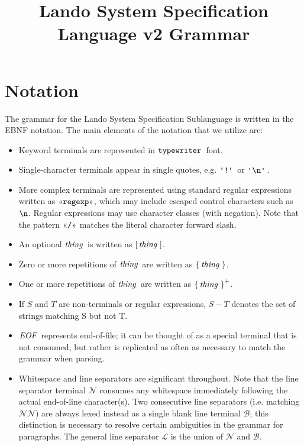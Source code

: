 \documentclass{article}
\newcommand{\gnn}{\ensuremath{\mathcal{N}}}
\newcommand{\gnl}{\ensuremath{\mathcal{L}}}
\newcommand{\gnb}{\ensuremath{\mathcal{B}}}
\begin{document}
\title{Lando System Specification Language v2 Grammar}
\maketitle

\section{Notation}

The grammar for the Lando System Specification Sublanguage is written in the EBNF notation. The main elements of the notation that we utilize are:
\begin{itemize}
  \item Keyword terminals are represented in $\mathop{\texttt{typewriter}}\,$ font. 
  \item Single-character terminals appear in single quotes, e.g. $\gtkc{!}$ or $\gtkc{\gtesc{n}}$.
  \item More complex terminals are represented using standard regular expressions written as $\gtregex{regexp}$, which may include escaped control characters such as $\texttt{\textbackslash {n}}$. Regular expressions may use character classes (with negation). Note that the pattern $\gtregex{/}$ matches the literal character forward slash.
  \item An optional $\mathop{\textit{thing}}\,$ is written as $\mathop{\operatorname{[} \mathop{\mathop{\textit{thing}}\,} \operatorname{]}}$.
  \item {Zero or more repetitions of $\mathop{\textit{thing}}\,$ are written as $\mathop{\operatorname{\{} \mathop{\textit{thing}}\, \operatorname{\}}}$}.
  \item One or more repetitions of $\mathop{\textit{thing}}\,$ are written as $\mathop{\operatorname{\{} \mathop{\textit{thing}}\, \operatorname{\}}^+}$.
  \item If $S$ and $T$ are non-terminals or regular expressions, $S - T$ denotes the set of strings matching S but not T.
  \item $\mathop{\textit{EOF}}\,$ represents end-of-file; it can be thought of as a special terminal that is not consumed, but rather is replicated as often as necessary to match the grammar when parsing.
  \item Whitespace and line separators are significant throughout. Note that the line separator terminal $\gnn$ consumes any whitespace immediately following the actual end-of-line character(s). Two consecutive line separators (i.e. matching $\gnn\gnn$) are always lexed instead as a single blank line terminal $\gnb$;
    this distinction is necessary to resolve certain ambiguities in the grammar for paragraphs.
    The general line separator $\gnl$ is the union of $\gnn$ and $\gnb$.
\end{itemize}
\end{document}
